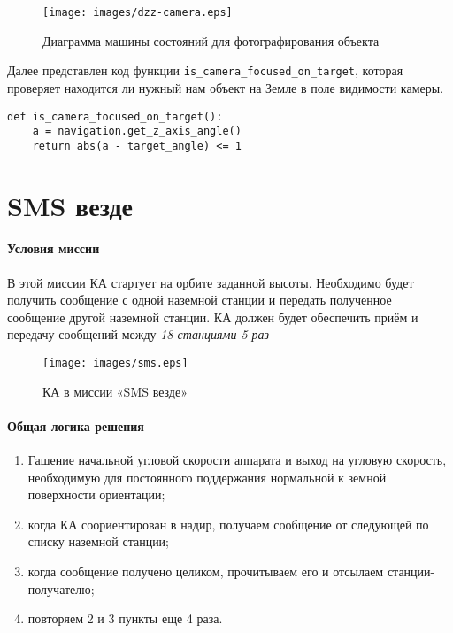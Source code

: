 \documentclass[12pt,a4paper]{article}
\begin{document}
\begin{figure}[tbh]
  \begin{flushright}
    \texttt{[image: images/dzz-camera.eps]}
    \caption{Диаграмма машины состояний для фотографирования объекта}
    \label{Pic:DZZ-camera}
  \end{flushright}
\end{figure}

Далее представлен код функции \verb'is_camera_focused_on_target', которая проверяет находится ли нужный нам объект на Земле в поле видимости камеры.

\begin{verbatim}
def is_camera_focused_on_target():
    a = navigation.get_z_axis_angle()
    return abs(a - target_angle) <= 1
\end{verbatim}

\section{SMS везде}

\paragraph{Условия миссии} В этой миссии КА стартует на орбите
заданной высоты. Необходимо будет получить сообщение с одной наземной станции и передать полученное сообщение другой наземной станции. КА должен будет обеспечить приём и передачу сообщений между \emph{18 станциями 5 раз}

\begin{figure}[tbh]
  \begin{center}
    \texttt{[image: images/sms.eps]}
    \caption{КА в миссии «SMS везде»}
    \label{Pic:SMS}
  \end{center}
\end{figure}


\paragraph{Общая логика решения} 

\begin{enumerate}
\item Гашение начальной угловой скорости аппарата и выход на угловую скорость, необходимую для постоянного поддержания нормальной к земной поверхности ориентации;
\item когда КА соориентирован в надир, получаем сообщение от следующей по списку наземной станции;
\item когда сообщение получено целиком, прочитываем его и отсылаем станции-получателю;
\item повторяем 2 и 3 пункты еще 4 раза.
\end{enumerate}
\end{document}
